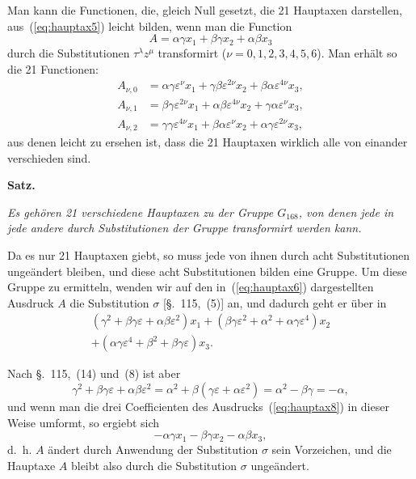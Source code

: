 \documentclass[12pt,a4paper]{article}
\begin{document}
Man kann die Functionen, die, gleich Null gesetzt, die 21 Hauptaxen darstellen, aus~(\ref{eq:hauptax5}) leicht bilden, wenn man die Function
\begin{equation}
\label{eq:hauptax6} A = \alpha\gamma x_1 + \beta\gamma x_2 + \alpha\beta x_3
\end{equation}
durch die Substitutionen $\tau^{\lambda} z^{\mu}$ transformirt ($\nu = 0, 1, 2, 3, 4, 5, 6$). Man erh\"alt so die 21 Functionen:
\begin{equation}
\label{eq:hauptax7} \begin{aligned}
A_{\nu,0} &= \alpha\gamma\varepsilon^{\nu}x_1 + \gamma\beta\varepsilon^{2\nu}x_2 + \beta\alpha\varepsilon^{4\nu}x_3,\\
A_{\nu,1} &= \beta\gamma\varepsilon^{2\nu}x_1 + \alpha\beta\varepsilon^{4\nu}x_2 + \gamma\alpha\varepsilon^{\nu}x_3,\\
A_{\nu,2} &= \gamma\gamma\varepsilon^{4\nu}x_1 + \beta\alpha\varepsilon^{\nu}x_2 + \alpha\gamma\varepsilon^{2\nu}x_3,
\end{aligned}
\end{equation}
aus denen leicht zu ersehen ist, dass die 21 Hauptaxen wirklich alle von einander verschieden sind.

\begin{center}\textbf{Satz.}\end{center}
\textit{Es geh\"oren 21 verschiedene Hauptaxen zu der Gruppe $G_{168}$, von denen jede in jede andere durch Substitutionen der Gruppe transformirt werden kann.}

Da es nur 21 Hauptaxen giebt, so muss jede von ihnen durch acht Substitutionen unge\"andert bleiben, und diese acht Substitutionen bilden eine Gruppe. Um diese Gruppe zu ermitteln, wenden wir auf den in~(\ref{eq:hauptax6}) dargestellten Ausdruck $A$ die Substitution $\sigma$ [\S.~115,~(5)] an, und dadurch geht er \"uber in
\begin{multline}
\label{eq:hauptax8} (\gamma^2 + \beta\gamma\varepsilon + \alpha\beta\varepsilon^2)x_1 + (\beta\gamma\varepsilon^2 + \alpha^2 + \alpha\gamma\varepsilon^4)x_2\\ + (\alpha\gamma\varepsilon^4 + \beta^2 + \beta\gamma\varepsilon)x_3.
\end{multline}

Nach \S.~115,~(14) und~(8) ist aber
\[\gamma^2 + \beta\gamma\varepsilon + \alpha\beta\varepsilon^2 = \alpha^2 + \beta(\gamma\varepsilon + \alpha\varepsilon^2) = \alpha^2 - \beta\gamma = -\alpha,\]
und wenn man die drei Coefficienten des Ausdrucks~(\ref{eq:hauptax8}) in dieser Weise umformt, so ergiebt sich
\[-\alpha\gamma x_1 - \beta\gamma x_2 - \alpha\beta x_3,\]
d.~h. $A$ \"andert durch Anwendung der Substitution $\sigma$ sein Vorzeichen, und die Hauptaxe $A$ bleibt also durch die Substitution $\sigma$ unge\"andert.
\end{document}
